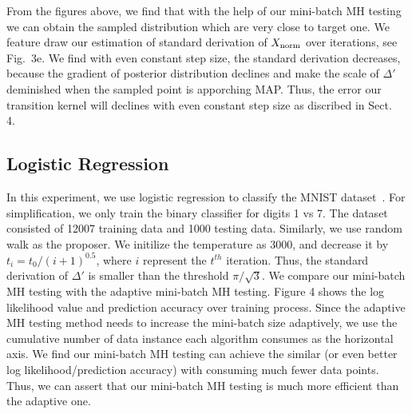\documentclass{article}
\begin{document}
From the figures above, we find that with the help of our mini-batch MH testing we can obtain the
sampled distribution which are very close to target one. We feature draw our estimation of standard
derivation of $X_{\rm norm}$ over iterations, see Fig.~3e. We find with even constant step size, the
standard derivation decreases, because the gradient of posterior distribution declines and make the
scale of $\Delta'$ deminished when the sampled point is apporching MAP. Thus, the error our
transition kernel will declines with even constant step size as discribed in Sect.~ 4.

\subsection{Logistic Regression}\label{ssec:logistic}

In this experiment, we use logistic regression to classify the MNIST
dataset~\cite{lecun-mnisthandwrittendigit-2010}. For simplification, we only train the binary
classifier for digits 1 vs 7. The dataset consisted of 12007 training data and 1000 testing data.
Similarly, we use random walk as the proposer. We initilize the temperature as 3000, and decrease it by $t_i = t_0 / (i + 1)^{0.5}$, where $i$ represent the $t^{th}$ iteration. Thus, the standard derivation of $\Delta'$ is smaller than the threshold $\pi/\sqrt{3}$.  We compare our mini-batch MH testing with the
adaptive mini-batch MH testing. Figure 4 shows the log likelihood value and prediction accuracy over
training process. Since the adaptive MH testing method needs to increase the mini-batch size
adaptively, we use the cumulative number of data instance each algorithm consumes as the horizontal
axis. We find our mini-batch MH testing can achieve the similar (or even better log
likelihood/prediction accuracy) with consuming much fewer data points. Thus, we can assert that our
mini-batch MH testing is much more efficient than the adaptive one. 
\end{document}
